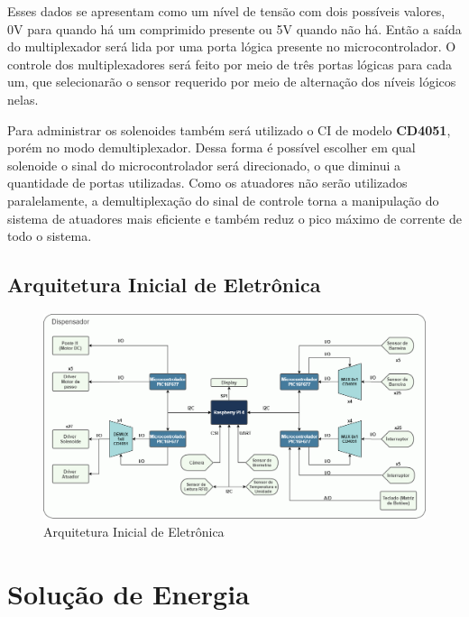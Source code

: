     Esses dados se apresentam como um nível de tensão com dois possíveis valores, 0V para quando há um comprimido presente ou 5V quando não há. Então a saída do multiplexador será lida por uma porta lógica presente no microcontrolador. O controle dos multiplexadores será feito por meio de três portas lógicas para cada um, que selecionarão o sensor requerido por meio de alternação dos níveis lógicos nelas.
    
    Para administrar os solenoides também será utilizado o CI de modelo \textbf{CD4051}, porém no modo demultiplexador. Dessa forma é possível escolher em qual solenoide o sinal do microcontrolador será direcionado, o que diminui a quantidade de portas utilizadas. Como os atuadores não serão utilizados paralelamente, a demultiplexação do sinal de controle torna a manipulação do sistema de atuadores mais eficiente e também reduz o pico máximo de corrente de todo o sistema.
    

    
\subsection{Arquitetura Inicial de Eletrônica}

\begin{figure}[H]
    \centering
    \includegraphics[width=\textwidth]{figuras/fluxograma_eletronica.png}
    \caption{Arquitetura Inicial de Eletrônica}
    \label{fig:fluxograma_eletronica}
\end{figure}
    
    
\section{Solução de Energia}
\label{Solução_energia}

